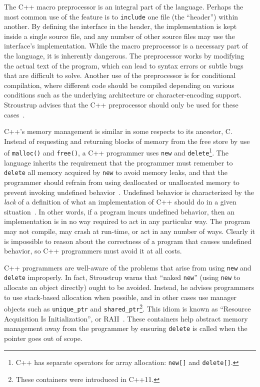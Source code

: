 \documentclass[draftcopy]{srpaper}
\begin{document}
The C++ macro preprocessor is an integral part of the language. Perhaps the
most common use of the feature is to \texttt{include} one file (the ``header'')
within another. By defining the interface in the header, the implementation is
kept inside a single source file, and any number of other source files may use
the interface's implementation. While the macro preprocessor is a necessary
part of the language, it is inherently dangerous. The preprocessor works by
modifying the actual text of the program, which can lead to syntax errors or
subtle bugs that are difficult to solve. Another use of the preprocessor is
for conditional compilation, where different code should be compiled depending
on various conditions such as the underlying architecture or character-encoding
support. Stroustrup advises that the C++ preprocessor should only be used for
these cases~\cite{stroustrup2013the}.

C++'s memory management is similar in some respects to its ancestor, C. Instead
of requesting and returning blocks of memory from the free store by use of
\texttt{malloc()} and \texttt{free()}, a C++ programmer uses \texttt{new} and
\texttt{delete}\footnote{C++ has separate operators for array allocation:
    \texttt{new[]} and \texttt{delete[]}.}. The language inherits the
requirement that the programmer must remember to \texttt{delete} all memory
acquired by \texttt{new} to avoid memory leaks, and that the programmer should
refrain from using deallocated or unallocated memory to prevent invoking
undefined behavior~\cite{stroustrup2013the}. Undefined behavior is
characterized by the \textit{lack} of a definition of what an implementation of
C++ should do in a given situation~\cite{iso/iec}. In other words, if a program
incurs undefined behavior, then an implementation is in no way required to act
in any particular way. The program may not compile, may crash at run-time, or
act in any number of ways. Clearly it is impossible to reason about the
correctness of a program that causes undefined behavior, so C++ programmers
must avoid it at all costs.

C++ programmers are well-aware of the problems that arise from using
\texttt{new} and \texttt{delete} improperly. In fact, Stroustrup warns that
``naked \texttt{new}'' (using \texttt{new} to allocate an object directly)
ought to be avoided. Instead, he advises programmers to use stack-based
allocation when possible, and in other cases use manager objects such as
\texttt{unique\_ptr} and \texttt{shared\_ptr}\footnote{These containers were
    introduced in C++11.}. This idiom is known as ``Resource Acquisition Is
Initialization'', or RAII~\cite{stroustrup2013the}. These containers help
abstract memory management away from the programmer by ensuring \texttt{delete}
is called when the pointer goes out of scope.
\end{document}
